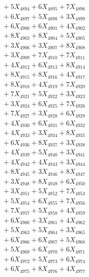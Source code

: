 \documentclass[a4paper,10pt]{article}
\begin{document}
{\begin{align}
&\;  + 5 X_{4894} + 6 X_{4895} + 7 X_{4896} \\[0.3ex]
&\;  + 6 X_{4897} + 5 X_{4898} + 3 X_{4899} \\[0.5ex]\allowbreak
&\;  + 6 X_{4900} + 6 X_{4901} + 4 X_{4902} \\[0.3ex]
&\;  + 8 X_{4903} + 8 X_{4904} + 5 X_{4905} \\[0.3ex]
&\;  + 3 X_{4906} + 3 X_{4907} + 8 X_{4908} \\[0.3ex]
&\;  + 3 X_{4909} + 7 X_{4910} + 7 X_{4911} \\[0.3ex]
&\;  + 4 X_{4912} + 6 X_{4913} + 8 X_{4914} \\[0.3ex]
&\;  + 8 X_{4915} + 8 X_{4916} + 4 X_{4917} \\[0.3ex]
&\;  + 8 X_{4918} + 4 X_{4919} + 7 X_{4920} \\[0.3ex]
&\;  + 7 X_{4921} + 5 X_{4922} + 3 X_{4923} \\[0.3ex]
&\;  + 3 X_{4924} + 6 X_{4925} + 7 X_{4926} \\[0.3ex]
&\;  + 7 X_{4927} + 3 X_{4928} + 6 X_{4929} \\[0.5ex]\allowbreak
&\;  + 4 X_{4930} + 6 X_{4931} + 6 X_{4932} \\[0.3ex]
&\;  + 4 X_{4933} + 3 X_{4934} + 8 X_{4935} \\[0.3ex]
&\;  + 6 X_{4936} + 8 X_{4937} + 3 X_{4938} \\[0.3ex]
&\;  + 4 X_{4939} + 5 X_{4940} + 3 X_{4941} \\[0.3ex]
&\;  + 4 X_{4942} + 4 X_{4943} + 3 X_{4944} \\[0.3ex]
&\;  + 8 X_{4945} + 3 X_{4946} + 8 X_{4947} \\[0.3ex]
&\;  + 3 X_{4948} + 8 X_{4949} + 6 X_{4950} \\[0.3ex]
&\;  + 3 X_{4951} + 5 X_{4952} + 7 X_{4953} \\[0.3ex]
&\;  + 5 X_{4954} + 6 X_{4955} + 7 X_{4956} \\[0.3ex]
&\;  + 7 X_{4957} + 5 X_{4958} + 4 X_{4959} \\[0.5ex]\allowbreak
&\;  + 6 X_{4960} + 3 X_{4961} + 4 X_{4962} \\[0.3ex]
&\;  + 5 X_{4963} + 5 X_{4964} + 3 X_{4965} \\[0.3ex]
&\;  + 6 X_{4966} + 6 X_{4967} + 5 X_{4968} \\[0.3ex]
&\;  + 5 X_{4969} + 6 X_{4970} + 6 X_{4971} \\[0.3ex]
&\;  + 6 X_{4972} + 5 X_{4973} + 6 X_{4974} \\[0.3ex]
&\;  + 6 X_{4975} + 8 X_{4976} + 4 X_{4977} \\[0.3ex]

\end{align}}
\end{document}
